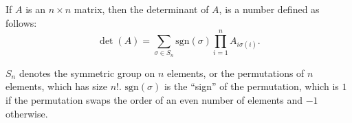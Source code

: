 \begin{definition}[Determinant]
    If $A$ is an $n \times n$ matrix, then the determinant of $A$, is a number defined as follows: \[\det(A) = \sum_{\sigma \in S_n} \mathrm{sgn}(\sigma)\prod_{i = 1}^n A_{i\sigma(i)}.\]
\end{definition}

$S_n$ denotes the symmetric group on $n$ elements, or the permutations of $n$ elements, which has size $n!$. $\mathrm{sgn}(\sigma)$ is the ``sign'' of the permutation, which is $1$ if the permutation swaps the order of an even number of elements and $-1$ otherwise.